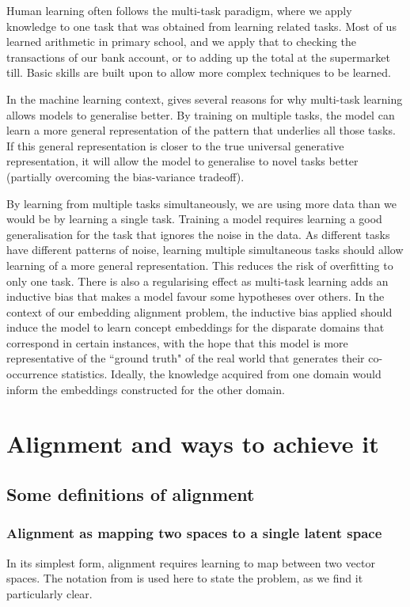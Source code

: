 Human learning often follows the multi-task paradigm, where we apply knowledge to one task that was obtained from learning related tasks. Most of us learned arithmetic in primary school, and we apply that to checking the transactions of our bank account, or to adding up the total at the supermarket till. Basic skills are built upon to allow more complex techniques to be learned. 

In the machine learning context, \cite{OverviewMultiTaskLearning} gives several reasons for why multi-task learning allows models to generalise better. By training on multiple tasks, the model can learn a more general representation of the pattern that underlies all those tasks. If this general representation is closer to the true universal generative representation, it will allow the model to generalise to novel tasks better (partially overcoming the bias-variance tradeoff). %

By learning from multiple tasks simultaneously, we are using more data than we would be by learning a single task. Training a model requires learning a good generalisation for the task that ignores the noise in the data. As different tasks have different patterns of noise, learning multiple simultaneous tasks should allow learning of a more general representation. This reduces the risk of overfitting to only one task. There is also a regularising effect as multi-task learning adds an inductive bias that makes a model favour some hypotheses over others. In the context of our embedding alignment problem, the inductive bias applied should induce the model to learn concept embeddings for the disparate domains that correspond in certain instances, with the hope that this model is more representative of the ``ground truth" of the real world that generates their co-occurrence statistics. Ideally, the knowledge acquired from one domain would inform the embeddings constructed for the other domain. 

\newpage
\section{Alignment and ways to achieve it}
    
\subsection{Some definitions of alignment}

\subsubsection{Alignment as mapping two spaces to a single latent space}
In its simplest form, alignment requires learning to map between two vector spaces. The notation from \cite{ManifoldLearningTheoryAndApplications} is used here to state the problem, as we find it particularly clear.

